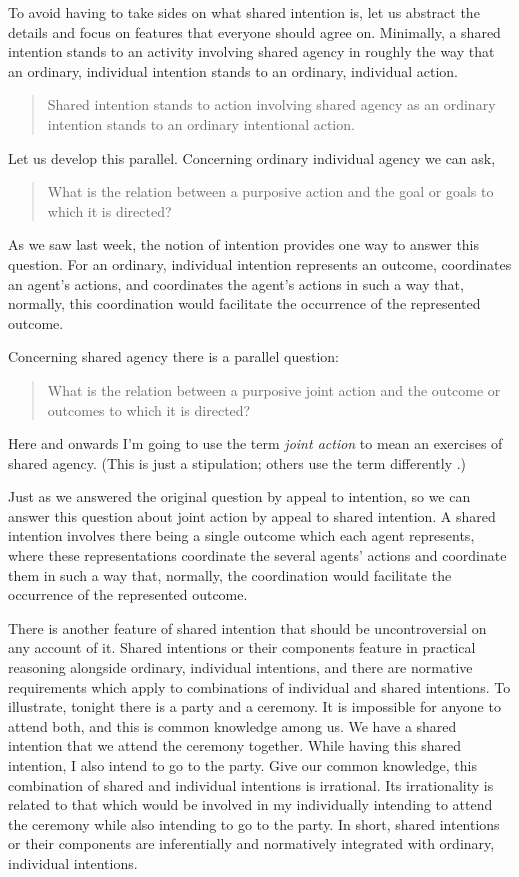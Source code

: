 \documentclass[12pt,\papersize]{extarticle}
\begin{document}
To avoid having to take sides on what shared intention is, 
let us abstract the details
and focus on features that everyone should agree on.
Minimally, a shared intention stands to an activity involving shared agency  in roughly the way that an ordinary, individual intention stands to an ordinary, individual action.
%
\begin{quote}
Shared intention stands to action involving shared agency as an ordinary intention stands to an ordinary intentional action.
\end{quote}
%
Let us develop this parallel.
Concerning ordinary individual agency we can ask,
\begin{quote}
What is the relation between a purposive action and the goal or goals to which it is directed?
\end{quote}
As we saw last week, the notion of intention provides one way to answer this question.
For an ordinary, individual intention represents an outcome, coordinates an agent's actions, and coordinates the agent's actions in such a way that, normally, this coordination would facilitate the occurrence of the represented outcome.

Concerning shared agency there is a parallel question:
%
\begin{quote}
What is the relation between a purposive joint action and the outcome or outcomes to which it is directed?
\end{quote}
%
Here and onwards I'm going to use the term \emph{joint action} to mean an exercises of shared agency.
(This is just a stipulation; others use the term differently \citep[e.g.][]{ludwig_collective_2007}.)

Just as we answered the original question by appeal to intention,
so we can answer this question about joint action by appeal to shared intention.
A shared intention involves there being a single outcome which each agent represents, where these representations coordinate the several agents' actions and coordinate them in such a way that, normally, the coordination would facilitate the occurrence of the represented outcome. 


There is another feature of shared intention that should be uncontroversial on any account of it.  
Shared intentions or their components feature in practical reasoning alongside ordinary, individual intentions,
 and there are normative requirements which apply to combinations of individual and shared intentions.
To illustrate, tonight there is a party and a ceremony.
It is impossible for anyone to attend both, and this is common knowledge among us.
We have a shared intention that we attend the ceremony together.
While having this shared intention, I also intend to go to the party. 
Give our common knowledge,
this combination of shared and individual intentions is irrational. 
Its irrationality is related to that which would be involved in my individually intending to attend the ceremony while also intending to go to the party.
In short, shared intentions or their components are inferentially and normatively integrated with ordinary, individual intentions.
\end{document}
